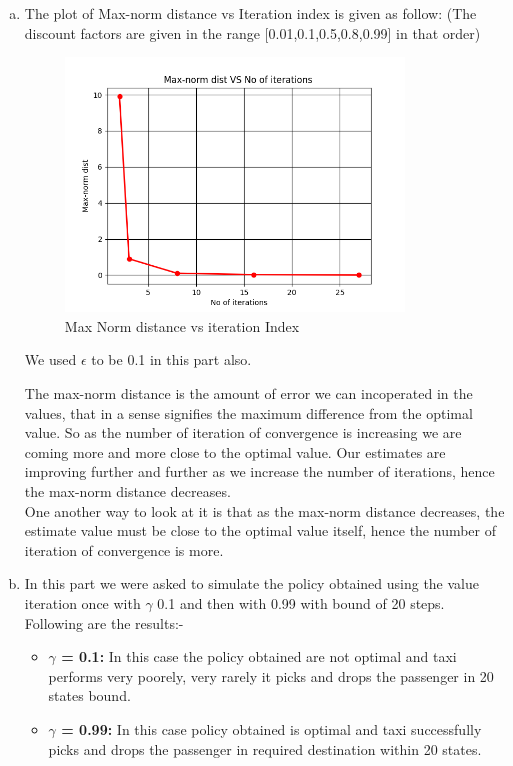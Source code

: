 \documentclass{article}
\begin{document}
\begin{enumerate}[a)]
    
    \item The plot of Max-norm distance vs Iteration index is given as follow: (The discount factors are given in the range [0.01,0.1,0.5,0.8,0.99] in that order)
    \begin{center}
        \begin{figure}[H]
        \hfill\includegraphics[width=9cm]{QA2b.png}\hspace*{\fill}
        \caption{Max Norm distance vs iteration Index}
        \label{fig:Max Norm distance vs iteration Index}
    \end{figure}
    \end{center}
    We used $\epsilon$ to be 0.1 in this part also.


    The max-norm distance is the amount of error we can incoperated in the values, that in a sense signifies the maximum difference from the optimal value. So as the number of iteration of convergence is increasing we are coming more and more close to the optimal value. Our estimates are improving further and further as we increase the number of iterations, hence the max-norm distance decreases. \\
    
    One another way to look at it is that as the max-norm distance decreases, the estimate value must be close to the optimal value itself, hence the number of iteration of convergence is more. 
    \item In this part we were asked to simulate the policy obtained using the value iteration once with $\gamma$ 0.1 and then with 0.99 with bound of 20 steps. Following are the results:- 
    
    \begin{itemize}
        \item \textbf{$\gamma$ = 0.1: } In this case the policy obtained are not optimal and taxi performs very poorely, very rarely it picks and drops the passenger in 20 states bound.
        \item \textbf{$\gamma$ = 0.99: } In this case policy obtained is optimal and taxi successfully picks and drops the passenger in required destination within 20 states.
    \end{itemize}


\end{enumerate}
\end{document}
